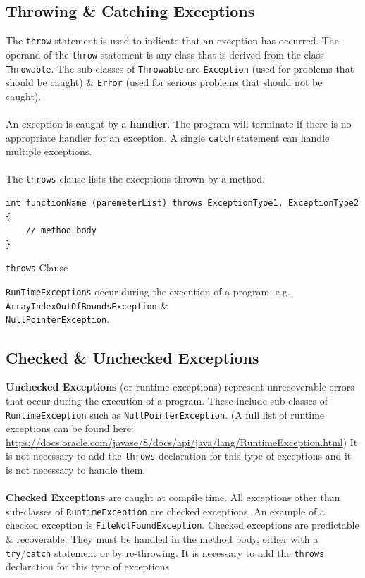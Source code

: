 \documentclass[a4paper,11pt]{article}
\newenvironment{code}{\captionsetup{type=listing}}{}
\begin{document}
\subsection{Throwing \& Catching Exceptions}
The \verb|throw| statement is used to indicate that an exception has occurred. 
The operand of the \verb|throw| statement is any class that is derived from the class \verb|Throwable|. 
The sub-classes of \verb|Throwable| are \verb|Exception| (used for problems that should be caught) \& \verb|Error| 
(used for serious problems that should not be caught).
\\\\
An exception is caught by a \textbf{handler}.
The program will terminate if there is no appropriate handler for an exception.
A single \verb|catch| statement can handle multiple exceptions. 
\\\\
The \verb|throws| clause lists the exceptions thrown by a method. 
\begin{code}
\begin{verbatim}
int functionName (paremeterList) throws ExceptionType1, ExceptionType2 {
    // method body
}
\end{verbatim}
\caption{\texttt{throws} Clause}
\end{code}

\verb|RunTimeExceptions| occur during the execution of a program, e.g. \verb|ArrayIndexOutOfBoundsException| \& \\
\verb|NullPointerException|. 

\subsection{Checked \& Unchecked Exceptions}
\textbf{Unchecked Exceptions} (or runtime exceptions) represent unrecoverable errors that occur during the execution of a 
program. 
These include sub-classes of \verb|RuntimeException| such as \verb|NullPointerException|.
(A full list of runtime exceptions can be found here: \url{https://docs.oracle.com/javase/8/docs/api/java/lang/RuntimeException.html})
It is not necessary to add the \verb|throws| declaration for this type of exceptions and it is not necessary to handle 
them.
\\\\ 
\textbf{Checked Exceptions} are caught at compile time. 
All exceptions other than sub-classes of \verb|RuntimeException| are checked exceptions. 
An example of a checked exception is \verb|FileNotFoundException|. 
Checked exceptions are predictable \& recoverable.
They must be handled in the method body, either with a \verb|try|/\verb|catch| statement or by re-throwing. 
It is necessary to add the \verb|throws| declaration for this type of exceptions
\end{document}
